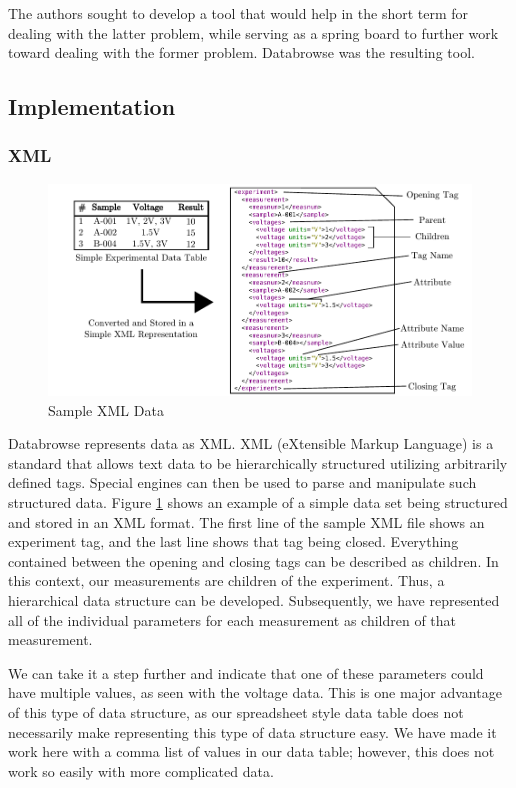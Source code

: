 \documentclass[10pt]{article}
\begin{document}
The authors sought to develop a tool that would help in the short term for dealing with the latter problem, while serving as a spring board to further work toward dealing with the former problem.  Databrowse was the resulting tool.

\subsection{Implementation}

\subsubsection{XML}

\begin{figure}
	\includegraphics{Chapter4_XMLSample.pdf}
	\caption{Sample XML Data}
	\label{fig:4:xmlsample}
\end{figure}

Databrowse represents data as XML.  XML (eXtensible Markup Language) is a standard that allows text data to be hierarchically structured utilizing arbitrarily defined tags.  Special engines can then be used to parse and manipulate such structured data.  Figure \ref{fig:4:xmlsample} shows an example of a simple data set being structured and stored in an XML format.  The first line of the sample XML file shows an experiment tag, and the last line shows that tag being closed.  Everything contained between the opening and closing tags can be described as children.  In this context, our measurements are children of the experiment.  Thus, a hierarchical data structure can be developed.  Subsequently, we have represented all of the individual parameters for each measurement as children of that measurement.  

We can take it a step further and indicate that one of these parameters could have multiple values, as seen with the voltage data.  This is one major advantage of this type of data structure, as our spreadsheet style data table does not necessarily make representing this type of data structure easy.  We have made it work here with a comma list of values in our data table; however, this does not work so easily with more complicated data.
\end{document}
